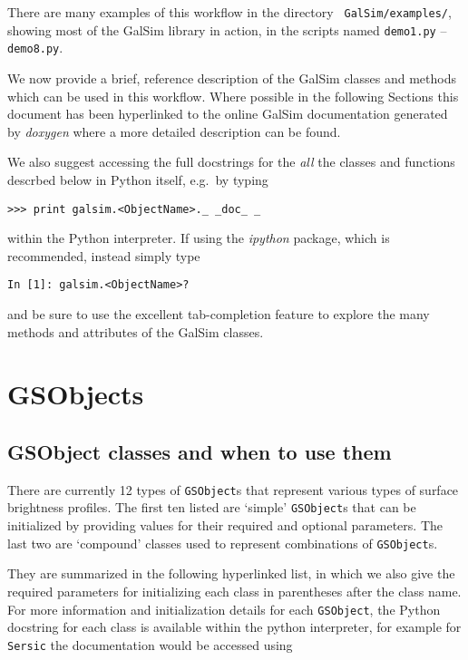 \documentclass[preprint,11pt]{aastex}
\begin{document}
There are many examples of this workflow in the directory {\tt
  GalSim/examples/}, showing most of the GalSim library in action, in
the scripts named \texttt{demo1.py} -- \texttt{demo8.py}.

We now provide a brief, reference description of the GalSim classes
and methods which can be used in this workflow.  Where possible in the
following Sections this document has been hyperlinked to the online
GalSim documentation generated by \emph{doxygen} where a more detailed
description can be found.

We also suggest accessing the full docstrings for the \emph{all} the
classes and functions descrbed below in Python itself, e.g.\ by typing

{\tt >>> print galsim.<ObjectName>.\_\,\_doc\_\,\_}

within the Python interpreter.  If using the \emph{ipython} package,
which is recommended, instead simply type

{\tt In [1]: galsim.<ObjectName>?}

and be sure to use the excellent tab-completion feature to explore the many
methods and attributes of the GalSim classes.

\newpage

\section{GSObjects}\label{sect:gsobjects}

\subsection{GSObject classes and when to use them}
There are currently 12 types of \texttt{GSObject}s that represent various types of surface brightness
profiles. The first ten listed are 
`simple' \texttt{GSObject}s that can be initialized by providing values for
their required and optional parameters.  The last two are `compound'
classes used to represent combinations of \texttt{GSObject}s.  

They are summarized in the following hyperlinked list, in which we also give
the required parameters for initializing each class in parentheses
after the class name.  For more information and initialization details for each \texttt{GSObject},
the Python docstring for each class is available within the python interpreter, for example for
\texttt{Sersic} the documentation would be accessed using 
\end{document}
